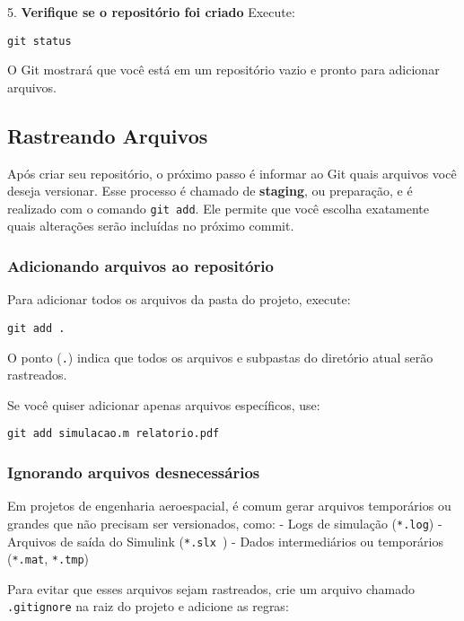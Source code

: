 5. \textbf{Verifique se o repositório foi criado}  
   Execute:
\begin{lstlisting}[style=shellstyle]
git status
\end{lstlisting}
O Git mostrará que você está em um repositório vazio e pronto para adicionar arquivos.


\subsection{Rastreando Arquivos}

Após criar seu repositório, o próximo passo é informar ao Git quais arquivos você deseja versionar. Esse processo é chamado de \textbf{staging}, ou preparação, e é realizado com o comando \texttt{git add}. Ele permite que você escolha exatamente quais alterações serão incluídas no próximo commit.

\subsubsection*{Adicionando arquivos ao repositório}

Para adicionar todos os arquivos da pasta do projeto, execute:

\begin{lstlisting}[style=shellstyle]
git add .
\end{lstlisting}

\noindent
O ponto (\texttt{.}) indica que todos os arquivos e subpastas do diretório atual serão rastreados.  

Se você quiser adicionar apenas arquivos específicos, use:

\begin{lstlisting}[style=shellstyle]
git add simulacao.m relatorio.pdf
\end{lstlisting}

\subsubsection*{Ignorando arquivos desnecessários}

Em projetos de engenharia aeroespacial, é comum gerar arquivos temporários ou grandes que não precisam ser versionados, como:  
- Logs de simulação (\texttt{*.log})  
- Arquivos de saída do Simulink (\texttt{*.slx~})  
- Dados intermediários ou temporários (\texttt{*.mat}, \texttt{*.tmp})

Para evitar que esses arquivos sejam rastreados, crie um arquivo chamado \texttt{.gitignore} na raiz do projeto e adicione as regras:

